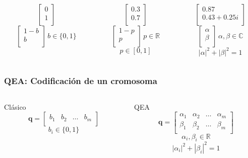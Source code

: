 \documentclass{beamer}
\begin{document}
\begin{frame}[t]
\begin{columns}[c]
	\begin{column}{0.33\textwidth}
		$$ \begin{bmatrix}
			0 \\
			1 \\
			\end{bmatrix} $$
		$$ \begin{bmatrix}
			1-b \\
			b \\
			\end{bmatrix}
			\, b \in \{0, 1\} $$
	\end{column}
	\vrule{}
	\begin{column}{0.33\textwidth}
		$$ \begin{bmatrix}
			0.3 \\
			0.7 \\
			\end{bmatrix} $$
		$$ \begin{bmatrix}
			1-p \\
			p \\
			\end{bmatrix}
			\, p \in \mathbb{R} $$
		$$ p \in [0,1]$$
	\end{column}
	\vrule{}
	\begin{column}{0.33\textwidth}
		$$ \begin{bmatrix}
			0.87 \\
			0.43 + 0.25i \\
			\end{bmatrix} $$
		$$ \begin{bmatrix}
			\alpha \\
			\beta \\
			\end{bmatrix} 
			\, \alpha, \beta \in \mathbb{C} $$
		$$ |\alpha|^2 + |\beta|^2 = 1 $$
	\end{column}
\end{columns}

\end{frame}
\begin{frame}
\frametitle{QEA: Codificación de un cromosoma}
\begin{columns}[c]
	\begin{column}{0.5\textwidth}
		\centering
		Clásico
		$$ \mathbf{q} = \begin{bmatrix}
			b_1	& b_2	& \ldots	& b_m\\
		\end{bmatrix} $$
		$$ b_i \in \{0, 1\}$$
	\end{column}
	\vrule{}
	\begin{column}{0.5\textwidth}
		\centering
		QEA
		$$ \mathbf{q} = \begin{bmatrix}
			\alpha_1	& \alpha_2	& \ldots	& \alpha_m\\
			\beta_1		& \beta_2		& \ldots	& \beta_m\\
		\end{bmatrix} $$
		$$ \alpha_i, \beta_i \in \mathbb{R} $$
		$$ |\alpha_i|^2 + |\beta_i|^2 = 1 $$
	\end{column}
\end{columns}
\end{frame}
\end{document}
